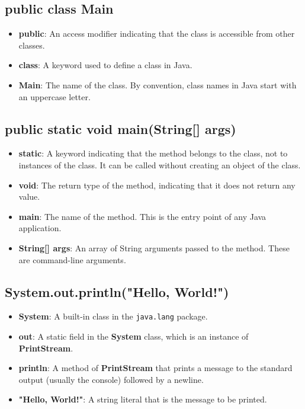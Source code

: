 \documentclass[a4paper,12pt]{article}
\begin{document}
\subsection*{public class Main}
\begin{itemize}[leftmargin=2cm]
    \item \textbf{public}: An access modifier indicating that the class is accessible from other classes.
    \item \textbf{class}: A keyword used to define a class in Java.
    \item \textbf{Main}: The name of the class. By convention, class names in Java start with an uppercase letter.
\end{itemize}

\subsection*{public static void main(String[] args)}
\begin{itemize}[leftmargin=2cm]
    \item \textbf{static}: A keyword indicating that the method belongs to the class, not to instances of the class. It can be called without creating an object of the class.
    \item \textbf{void}:  The return type of the method, indicating that it does not return any value.
    \item \textbf{main}: The name of the method. This is the entry point of any Java application.
    \item \textbf{String[] args}: An array of String arguments passed to the method. These are command-line arguments.
\end{itemize}

\subsection*{System.out.println("Hello, World!")}
\begin{itemize}[leftmargin=2cm]
    \item \textbf{System}: A built-in class in the \texttt{java.lang} package.
    \item \textbf{out}: A static field in the \textbf{System} class, which is an instance of \textbf{PrintStream}.
    \item \textbf{println}: A method of \textbf{PrintStream} that prints a message to the standard output (usually the console) followed by a newline.
    \item \textbf{"Hello, World!"}: A string literal that is the message to be printed.
\end{itemize}
\end{document}
